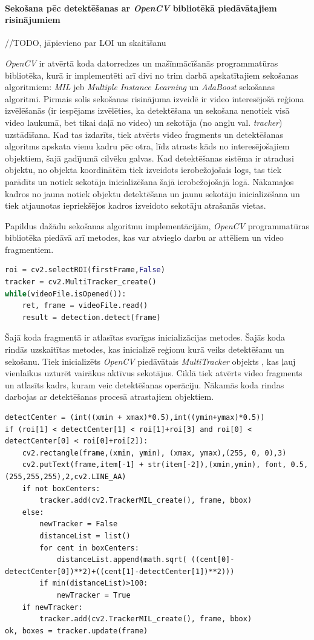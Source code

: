 \paragraph{Sekošana pēc detektēšanas ar \textit{OpenCV} bibliotēkā piedāvātajiem risinājumiem} //TODO, jāpievieno par LOI un skaitīšanu 
\hfill\par
\textit{OpenCV} ir atvērtā koda datorredzes un mašīnmācīšanās programmatūras bibliotēka, kurā ir implementēti arī divi no trim darbā apskatītajiem sekošanas algoritmiem: \textit{MIL} jeb \textit{Multiple Instance Learning} un \textit{AdaBoost} sekošanas algoritmi. Pirmais solis sekošanas risinājuma izveidē ir video interesējošā reģiona izvēlēšanās (ir iespējams izvēlēties, ka detektēšana un sekošana nenotiek visā video laukumā, bet tikai daļā no video) un sekotāja (no angļu val. \textit{tracker}) uzstādīšana. Kad tas izdarīts, tiek atvērts video fragments un detektēšanas algoritms apskata vienu kadru pēc otra, līdz atrasts kāds no interesējošajiem objektiem, šajā gadījumā cilvēku galvas. Kad detektēšanas sistēma ir atradusi objektu, no objekta koordinātēm tiek izveidots ierobežojošais logs, tas tiek parādīts un notiek sekotāja inicializēšana šajā ierobežojošajā logā. Nākamajos kadros no jauna notiek objektu detektēšana un jaunu sekotāju inicializēšana un tiek atjaunotas iepriekšējos kadros izveidoto sekotāju atrašanās vietas.  

Papildus dažādu sekošanas algoritmu implementācijām, \textit{OpenCV} programmatūras bibliotēka piedāvā arī metodes, kas var atvieglo darbu ar attēliem un video fragmentiem.  
\begin{lstlisting}[language=Python]
roi = cv2.selectROI(firstFrame,False)
tracker = cv2.MultiTracker_create()   
while(videoFile.isOpened()):  
	ret, frame = videoFile.read()     
	result = detection.detect(frame)    
\end{lstlisting}
Šajā koda fragmentā ir atlasītas svarīgas inicializācijas metodes. Šajās koda rindās uzskaitītas metodes, kas inicializē reģionu kurā veiks detektēšanu un sekošanu. Tiek inicializēts \textit{OpenCV} piedāvātais \textit{MultiTracker} objekts \cite{multitrack}, kas ļauj vienlaikus uzturēt vairākus aktīvus sekotājus. Ciklā tiek atvērts video fragments un atlasīts kadrs, kuram veic detektēšanas operāciju. Nākamās koda rindas darbojas ar detektēšanas procesā atrastajiem objektiem.

\begin{lstlisting}[basicstyle=\tiny]
detectCenter = (int((xmin + xmax)*0.5),int((ymin+ymax)*0.5))   
if (roi[1] < detectCenter[1] < roi[1]+roi[3] and roi[0] < detectCenter[0] < roi[0]+roi[2]):
	cv2.rectangle(frame,(xmin, ymin), (xmax, ymax),(255, 0, 0),3)            
	cv2.putText(frame,item[-1] + str(item[-2]),(xmin,ymin), font, 0.5,(255,255,255),2,cv2.LINE_AA)                   
	if not boxCenters:
		tracker.add(cv2.TrackerMIL_create(), frame, bbox)
	else:
		newTracker = False
		distanceList = list()
		for cent in boxCenters:
			distanceList.append(math.sqrt( ((cent[0]-detectCenter[0])**2)+((cent[1]-detectCenter[1])**2)))
		if min(distanceList)>100:
			newTracker = True
	if newTracker:
		tracker.add(cv2.TrackerMIL_create(), frame, bbox)
ok, boxes = tracker.update(frame)
\end{lstlisting}